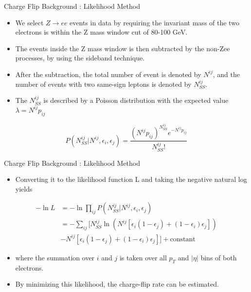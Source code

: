 \documentclass[mathserif,serif]{beamer}
\begin{document}
\begin{frame}{Charge Flip Background : Likelihood Method}
\begin{itemize}
\item We select $Z \rightarrow ee$ events in data by requiring the invariant mass of the two electrons is within the Z mass window cut of 80-100 GeV.
\item The events inside the Z mass window is then subtracted by the non-Zee processes, by using the sideband technique.
\item After the subtraction, the total number of event is denoted by $N^{ij}$, and the number of events with two same-sign leptons is denoted by $N^{ij}_{SS}$.
\item The $N^{ij}_{SS}$ is described by a Poisson distribution with the expected value $\lambda = N^{ij}p_{ij}$
\end{itemize}
\begin{equation*}
P(N^{ij}_{SS} | N^{ij}, \epsilon_i, \epsilon_j) = \frac{(N^{ij}p_{ij})^{N^{ij}_{SS}} e^{-N^{ij}p_{ij}}}{N^{ij}_{SS}!}
\end{equation*}
\end{frame}

\begin{frame}{Charge Flip Background : Likelihood Method}
\begin{itemize}
\item Converting it to the likelihood function L and taking the negative natural log yields
\end{itemize}
\begin{equation*}
\begin{split}
-\ln L &= -\ln\prod_{ij} P(N^{ij}_{SS} | N^{ij}, \epsilon_i, \epsilon_j) \\
&= - \sum_{ij} \Big[ N^{ij}_{SS} \ln (N^{ij}[\epsilon_i (1-\epsilon_j) + (1-\epsilon_i) \epsilon_j]) \\
&- N^{ij}[\epsilon_i (1-\epsilon_j) + (1-\epsilon_i) \epsilon_j] \Big] + \text{constant}
\end{split}
\end{equation*}
\begin{itemize}
\item where the summation over $i$ and $j$ is taken over all $p_T$ and $|\eta|$ bins of both electrons.
\item By minimizing this likelihood, the charge-flip rate can be estimated.
\end{itemize}
\end{frame}
\end{document}
